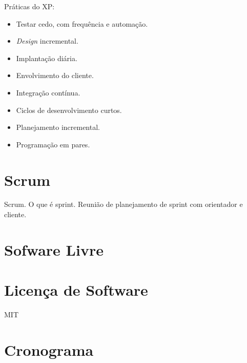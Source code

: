 Práticas do XP:

\begin{itemize}
    \item Testar cedo, com frequência e automação.
    \item \textit{Design} incremental.
    \item Implantação diária.
    \item Envolvimento do cliente.
    \item Integração contínua.
    \item Ciclos de desenvolvimento curtos.
    \item Planejamento incremental.
    \item Programação em pares.
\end{itemize}

\section{Scrum}
Scrum.
O que é sprint.
Reunião de planejamento de sprint com orientador e cliente.

\section{Sofware Livre}

\section{Licença de Software}
MIT

\section{Cronograma}
